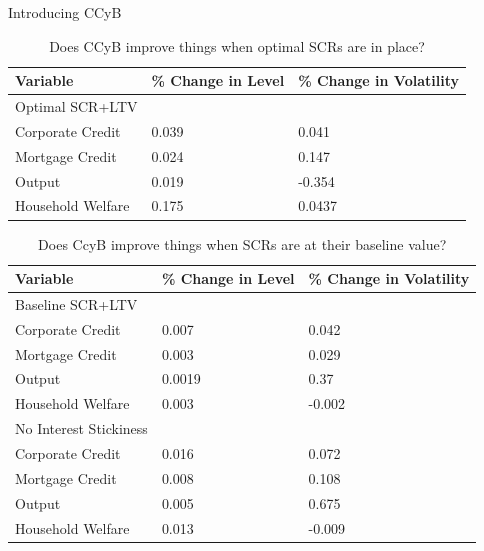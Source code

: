 \documentclass[8pt,aspectratio=169]{beamer}
\numberwithin{equation}{section}
\begin{document}
\begin{frame}{Introducing CCyB}

\begin{table}[h]
\caption{Does CCyB improve things when optimal SCRs are in place?}
\begin{tabular}{l|l|l}
\small
Variable & \% Change in Level & \% Change in Volatility \\
\hline
Optimal SCR+LTV & & \\
\hline
    Corporate Credit           &       0.039    &      0.041 \\
    Mortgage Credit            &      0.024    &       0.147 \\
    Output         &     0.019    &    -0.354 \\ 
    Household Welfare       &     0.175     &     0.0437\\
\end{tabular}
\end{table}



\begin{table}[h]
\caption{Does CcyB improve things when SCRs are at their baseline value? }
\begin{tabular}{l|l|l}
\small
Variable & \% Change in Level & \% Change in Volatility \\
\hline
Baseline SCR+LTV & & \\
\hline
    Corporate Credit           &       0.007    &      0.042 \\
    Mortgage Credit            &      0.003    &       0.029 \\
    Output         &     0.0019    &    0.37 \\ 
    Household Welfare       &     0.003     &     -0.002\\
  
 \hline
No Interest Stickiness & & \\
\hline

    Corporate Credit           &       0.016    &      0.072 \\
    Mortgage Credit            &      0.008    &       0.108 \\
    Output         &     0.005    &    0.675 \\ 
    Household Welfare       &     0.013     &     -0.009\\
  \end{tabular}
\end{table}


\end{frame}
\end{document}
